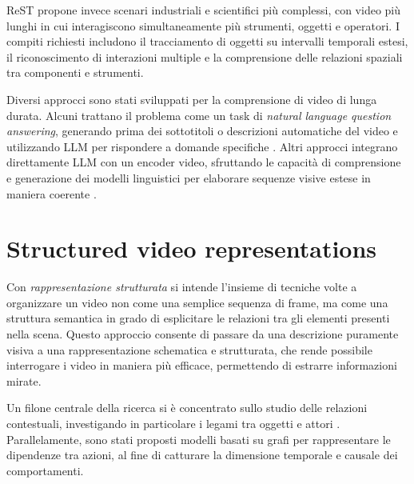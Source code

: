 ReST \cite{Yang_2023_CVPR} propone invece scenari industriali e scientifici più complessi, con video più lunghi in cui interagiscono simultaneamente più strumenti, oggetti e operatori. I compiti richiesti includono il tracciamento di oggetti su intervalli temporali estesi, il riconoscimento di interazioni multiple e la comprensione delle relazioni spaziali tra componenti e strumenti. 

Diversi approcci sono stati sviluppati per la comprensione di video di lunga durata. Alcuni trattano il problema come un task di \emph{natural language question answering}, generando prima dei sottotitoli o descrizioni automatiche del video e utilizzando LLM per rispondere a domande specifiche \cite{ma2024drvideodocumentretrievalbased, park2025framesusefulefficientstrategies, wang2024videoagentlongformvideounderstanding, wang2024lifelongmemoryleveragingllmsanswering, wang2025videotreeadaptivetreebasedvideo, wu2022memvitmemoryaugmentedmultiscalevision}. Altri approcci integrano direttamente LLM con un encoder video, sfruttando le capacità di comprensione e generazione dei modelli linguistici per elaborare sequenze visive estese in maniera coerente \cite{li2024llmsmeetlongvideo, qian2024streaminglongvideounderstanding, ren2024timechattimesensitivemultimodallarge, song2024moviechatdensetokensparse}.

\section{Structured video representations}

Con \emph{rappresentazione strutturata} si intende l'insieme di tecniche volte a organizzare un video non come una semplice sequenza di frame, ma come una struttura semantica in grado di esplicitare le relazioni tra gli elementi presenti nella scena. Questo approccio consente di passare da una descrizione puramente visiva a una rappresentazione schematica e strutturata, che rende possibile interrogare i video in maniera più efficace, permettendo di estrarre informazioni mirate.

Un filone centrale della ricerca si è concentrato sullo studio delle relazioni contestuali, investigando in particolare i legami tra oggetti e attori \cite{arnab2021unifiedgraphstructuredmodels, baradel2018objectlevelvisualreasoning, cong2021spatialtemporaltransformerdynamicscene, jain2016structuralrnndeeplearningspatiotemporal, ji2019actiongenomeactionscomposition, ma2018attendinteracthigherorderobject, sun2018actorcentricrelationnetwork, wang2018videosspacetimeregiongraphs}. Parallelamente, sono stati proposti modelli basati su grafi per rappresentare le dipendenze tra azioni, al fine di catturare la dimensione temporale e causale dei comportamenti.

